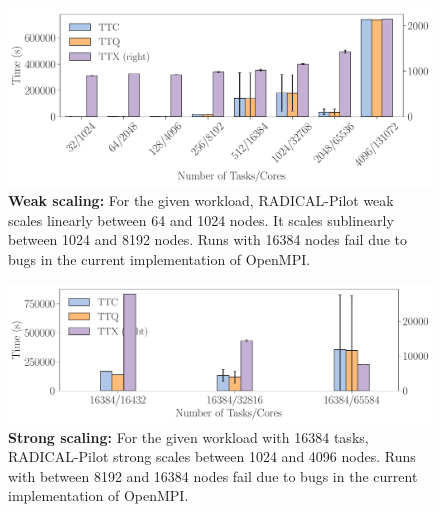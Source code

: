 \documentclass{article}
\begin{document}


\begin{figure}
  \centering
  \includegraphics[width=\columnwidth]{figures/paper_titan_rp_weak_scaling.pdf}
  \caption{\textbf{Weak scaling:} For the given workload, RADICAL-Pilot weak
	scales linearly between 64 and 1024 nodes. It scales sublinearly between
	1024 and 8192 nodes. Runs with 16384 nodes fail due to bugs in the
	current implementation of OpenMPI. }\label{fig:ws-ttc}
\end{figure}

\begin{figure}
  \centering
  \includegraphics[width=\columnwidth]{figures/paper_titan_rp_synapse_strong_scaling.pdf}
  \caption{\textbf{Strong scaling:} For the given workload with 16384 tasks,
	RADICAL-Pilot strong scales between 1024 and 4096 nodes. Runs with
	between 8192 and 16384 nodes fail due to bugs in the current
	implementation of OpenMPI.}\label{fig:ss-ttc}
\end{figure}
\end{document}
